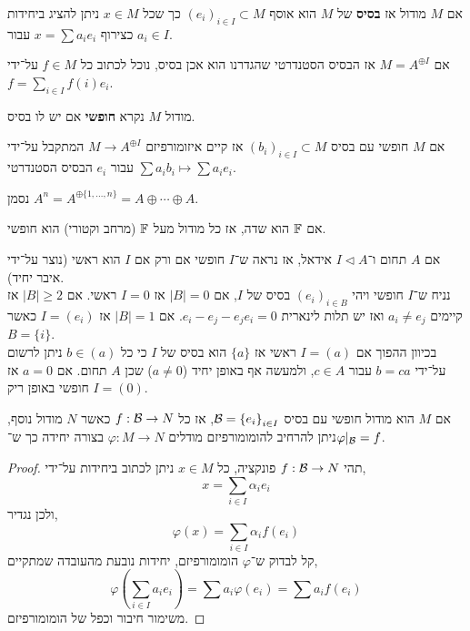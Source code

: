 \begin{definition}[בסיס]
	אם $M$ מודול אז \textbf{בסיס} של $M$ הוא אוסף ${(e_i)}_{i \in I} \subset M$ כך שכל $x \in M$ ניתן להציג ביחידות כצירוף $x = \sum a_i e_i$ עבור $a_i \in I$.
\end{definition}
\begin{example}
	אם $M = A^{\oplus I}$ אז הבסיס הסטנדרטי שהגדרנו הוא אכן בסיס, נוכל לכתוב כל $f \in M$ על־ידי $f = \sum_{i \in I} f(i) e_i$.
\end{example}
\begin{definition}
	מודול $M$ נקרא \textbf{חופשי} אם יש לו בסיס.
\end{definition}
\begin{corollary}
	אם $M$ חופשי עם בסיס ${( b_i )}_{i \in I} \subset M$ אז קיים איזומורפיזם $M \to A^{\oplus I}$ המתקבל על־ידי $\sum a_i b_i \mapsto \sum a_i e_i$ עבור $e_i$ הבסיס הסטנדרטי.
\end{corollary}
\begin{notation}
	נסמן $A^n = A^{\oplus \{1, \ldots, n\}} = A \oplus \cdots \oplus A$.
\end{notation}
\begin{example}
	אם $\mathbb{F}$ הוא שדה, אז כל מודול מעל $\mathbb{F}$ (מרחב וקטורי) הוא חופשי.
\end{example}
\begin{example}
	אם $A$ תחום ו־$I \triangleleft A$ אידאל, אז נראה ש־$I$ חופשי אם ורק אם $I$ הוא ראשי (נוצר על־ידי איבר יחיד). \\
	נניח ש־$I$ חופשי ויהי ${(e_i)}_{i \in B}$ בסיס של $I$, אם $|B| = 0$ אז $I = 0$ ראשי.
	אם $|B| \ge 2$ אז קיימים $a_i \ne e_j$ ואז יש תלות לינארית $e_i - e_j - e_j e_i = 0$.
	אם $|B| = 1$ אז $I = (e_i)$ כאשר $B = \{ i \}$. \\
	בכיוון ההפוך אם $I = (a)$ ראשי אז $\{ a \}$ הוא בסיס של $I$ כי כל $b \in (a)$ ניתן לרשום על־ידי $b = c a$ עבור $c \in A$, ולמעשה אף באופן יחיד ($a \ne 0$) שכן $A$ תחום.
	אם $a = 0$ אז $I = (0)$ חופשי באופן ריק.
\end{example}
\begin{theorem}
	אם $M$ הוא מודול חופשי עם בסיס $\mathcal{B} = {\{ e_i \}}_{i \in I}$, אז כל $f : \mathcal{B} \to N$ כאשר $N$ מודול נוסף, ניתן להרחיב להומומורפיזם מודלים $\varphi : M \to N$ בצורה יחידה כך ש־$\varphi |_{\mathcal{B}} = f$.
\end{theorem}
\begin{proof}
	תהי $f : \mathcal{B} \to N$ פונקציה, כל $x \in M$ ניתן לכתוב ביחידות על־ידי,
	\[
		x
		= \sum_{i \in I} \alpha_i e_i
	\]
	ולכן נגדיר,
	\[
		\varphi(x)
		= \sum_{i \in I} \alpha_i f(e_i)
	\]
	קל לבדוק ש־$\varphi$ הומומורפיזם, יחידות נובעת מהעובדה שמתקיים,
	\[
		\varphi(\sum_{i \in I} a_i e_i)
		= \sum a_i \varphi(e_i)
		= \sum a_i f(e_i)
	\]
	משימור חיבור וכפל של הומומורפיזם.
\end{proof}

